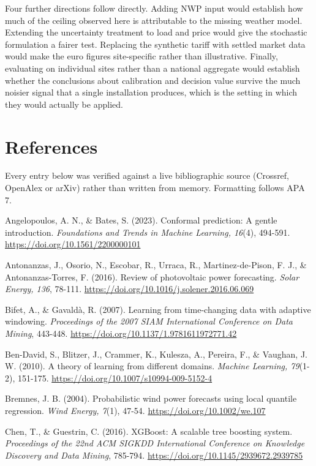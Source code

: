 \documentclass[11pt,a4paper,oneside]{report}
\begin{document}
Four further directions follow directly. Adding NWP input would establish how much of the ceiling observed here is attributable to the missing weather model. Extending the uncertainty treatment to load and price would give the stochastic formulation a fairer test. Replacing the synthetic tariff with settled market data would make the euro figures site-specific rather than illustrative. Finally, evaluating on individual sites rather than a national aggregate would establish whether the conclusions about calibration and decision value survive the much noisier signal that a single installation produces, which is the setting in which they would actually be applied.


\chapter{References}


Every entry below was verified against a live bibliographic source (Crossref, OpenAlex or arXiv) rather than written from memory. Formatting follows APA 7.

Angelopoulos, A. N., \& Bates, S. (2023). Conformal prediction: A gentle introduction. \emph{Foundations and Trends in Machine Learning, 16}(4), 494-591. \href{https://doi.org/10.1561/2200000101}{https://doi.org/10.1561/2200000101}

Antonanzas, J., Osorio, N., Escobar, R., Urraca, R., Martinez-de-Pison, F. J., \& Antonanzas-Torres, F. (2016). Review of photovoltaic power forecasting. \emph{Solar Energy, 136}, 78-111. \href{https://doi.org/10.1016/j.solener.2016.06.069}{https://doi.org/10.1016/j.solener.2016.06.069}

Bifet, A., \& Gavald\`a, R. (2007). Learning from time-changing data with adaptive windowing. \emph{Proceedings of the 2007 SIAM International Conference on Data Mining}, 443-448. \href{https://doi.org/10.1137/1.9781611972771.42}{https://doi.org/10.1137/1.9781611972771.42}

Ben-David, S., Blitzer, J., Crammer, K., Kulesza, A., Pereira, F., \& Vaughan, J. W. (2010). A theory of learning from different domains. \emph{Machine Learning, 79}(1-2), 151-175. \href{https://doi.org/10.1007/s10994-009-5152-4}{https://doi.org/10.1007/s10994-009-5152-4}

Bremnes, J. B. (2004). Probabilistic wind power forecasts using local quantile regression. \emph{Wind Energy, 7}(1), 47-54. \href{https://doi.org/10.1002/we.107}{https://doi.org/10.1002/we.107}

Chen, T., \& Guestrin, C. (2016). XGBoost: A scalable tree boosting system. \emph{Proceedings of the 22nd ACM SIGKDD International Conference on Knowledge Discovery and Data Mining}, 785-794. \href{https://doi.org/10.1145/2939672.2939785}{https://doi.org/10.1145/2939672.2939785}
\end{document}
